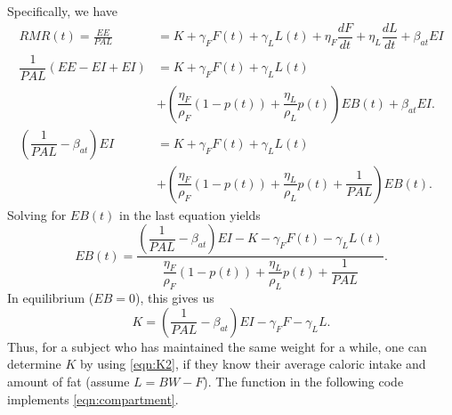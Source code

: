 Specifically, we have
\begin{align*}
RMR(t) = \frac{EE}{PAL}&= K + \gamma_F F(t) + \gamma_L L(t) + \eta_F \dfrac{dF}{dt} + \eta_L \dfrac{dL}{dt}  + \beta_{at} EI\\
\dfrac{1}{PAL}\left(EE - EI + EI \right) &= K + \gamma_F F(t) + \gamma_L L(t) \\
&+ \left(\dfrac{\eta_F}{\rho_F} (1-p(t)) + \dfrac{\eta_L}{\rho_L} p(t) \right) EB(t) + \beta_{at} EI.\\
\left(\dfrac{1}{PAL}-\beta_{at}\right) EI &= K + \gamma_F F(t) + \gamma_L L(t) \\
&+ \left(\dfrac{\eta_F}{\rho_F} (1-p(t)) + \dfrac{\eta_L}{\rho_L} p(t) + \dfrac{1}{PAL}\right) EB(t).
\end{align*}
Solving for $EB(t)$ in the last equation yields
\begin{equation}
\label{eqn:EB2}
EB(t) = \dfrac{\left( \dfrac{1}{PAL} - \beta_{at} \right) EI - K - \gamma_F F(t) - \gamma_L L(t)}{\dfrac{\eta_F}{\rho_F} (1-p(t)) + \dfrac{\eta_L}{\rho_L} p(t) + \dfrac{1}{PAL}}.
\end{equation}
In equilibrium ($EB = 0$), this gives us
\begin{equation}
\label{eqn:K2}
K = \left(\dfrac{1}{PAL}-\beta_{at}\right) EI - \gamma_F F - \gamma_L L.
\end{equation}
Thus, for a subject who has maintained the same weight for a while, one can determine $K$ by using \eqref{eqn:K2}, if they know their average caloric intake and amount of fat (assume $L=BW-F$).
The function  in the following code implements \eqref{eqn:compartment}.

